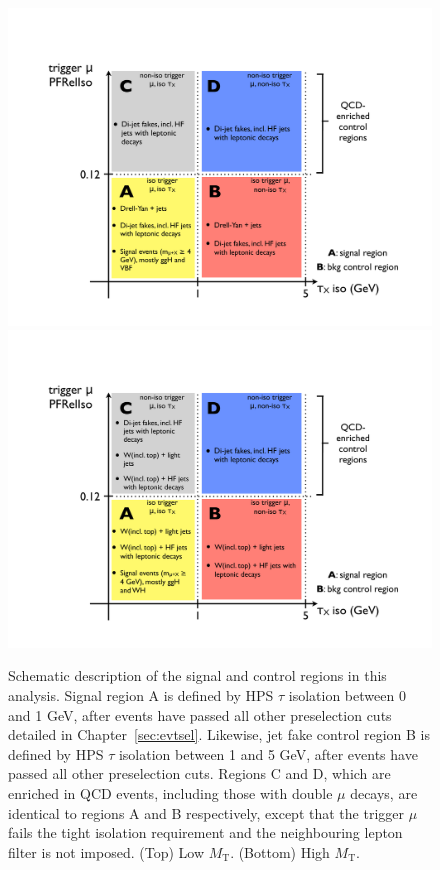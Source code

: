 \begin{figure}[hbtp]
  \begin{center}
    \includegraphics[width=2\cmsFigWidth]{figures/ABCD_annotated_lowMT}
    \includegraphics[width=2\cmsFigWidth]{figures/ABCD_annotated_highMT}
    \caption{Schematic description of the signal and control regions in this analysis. Signal region A is defined by HPS $\tau$ isolation between 0 and 1 GeV, after events have passed all other preselection cuts detailed in Chapter~\ref{sec:evtsel}. Likewise, jet fake control region B is defined by HPS $\tau$ isolation between 1 and 5 GeV, after events have passed all other preselection cuts. Regions C and D, which are enriched in QCD events, including those with double $\mu$ decays, are identical to regions A and B respectively, except that the trigger $\mu$ fails the tight isolation requirement and the neighbouring lepton filter is not imposed.  (Top) Low $M_{\text{T}}$.  (Bottom) High $M_{\text{T}}$.}
    \label{fig:regionsAB}
  \end{center}
\end{figure}

